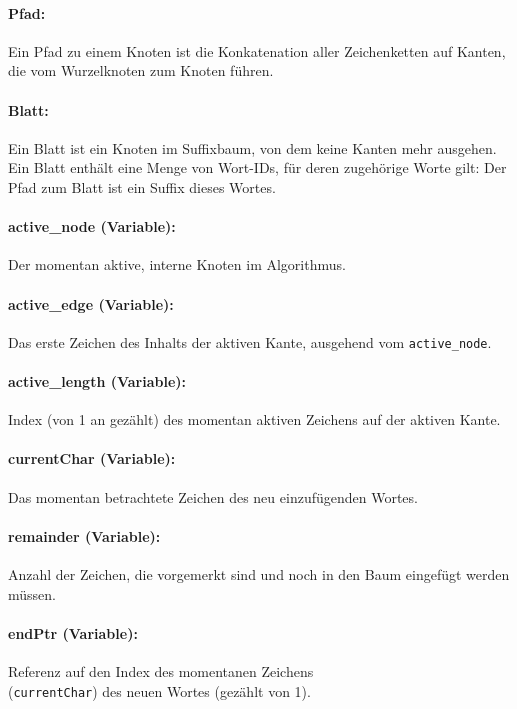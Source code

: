 \paragraph{Pfad:} Ein Pfad zu einem Knoten ist die Konkatenation aller Zeichenketten auf Kanten, die vom Wurzelknoten zum Knoten führen.

\paragraph{Blatt:} Ein Blatt ist ein Knoten im Suffixbaum, von dem keine Kanten mehr ausgehen. Ein Blatt enthält eine Menge von Wort-IDs, für deren zugehörige Worte gilt: Der Pfad zum Blatt ist ein Suffix dieses Wortes.

\paragraph{active\_node (Variable):} Der momentan aktive, interne Knoten im Algorithmus.

\paragraph{active\_edge (Variable):} Das erste Zeichen des Inhalts der aktiven Kante, ausgehend vom \texttt{active\_node}.

\paragraph{active\_length (Variable):} Index (von 1 an gezählt) des momentan aktiven Zeichens auf der aktiven Kante.

\paragraph{currentChar (Variable):} Das momentan betrachtete Zeichen des neu einzufügenden Wortes.

\paragraph{remainder (Variable):} Anzahl der Zeichen, die vorgemerkt sind und noch in den Baum eingefügt werden müssen.

\paragraph{endPtr (Variable):} Referenz auf den Index des momentanen Zeichens \\(\texttt{currentChar}) des neuen Wortes (gezählt von 1).

